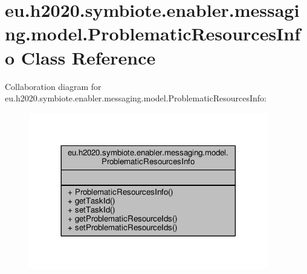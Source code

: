 \hypertarget{classeu_1_1h2020_1_1symbiote_1_1enabler_1_1messaging_1_1model_1_1ProblematicResourcesInfo}{}\section{eu.\+h2020.\+symbiote.\+enabler.\+messaging.\+model.\+Problematic\+Resources\+Info Class Reference}
\label{classeu_1_1h2020_1_1symbiote_1_1enabler_1_1messaging_1_1model_1_1ProblematicResourcesInfo}


Collaboration diagram for eu.\+h2020.\+symbiote.\+enabler.\+messaging.\+model.\+Problematic\+Resources\+Info\+:
\nopagebreak
\begin{figure}[H]
\begin{center}
\leavevmode
\includegraphics[width=296pt]{classeu_1_1h2020_1_1symbiote_1_1enabler_1_1messaging_1_1model_1_1ProblematicResourcesInfo__coll__graph}
\end{center}
\end{figure}
